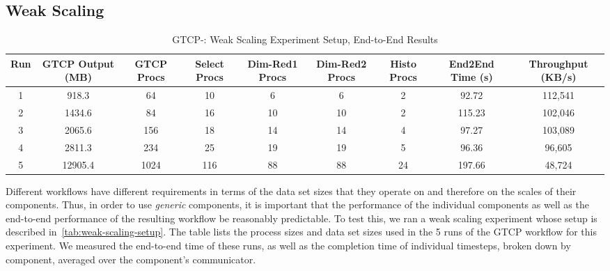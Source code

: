 \subsection{Weak Scaling}
\begin{table}[tbp]
  \centering
  \caption{GTCP-\sys: Weak Scaling Experiment Setup, End-to-End Results}
  \label{tab:weak-scaling-setup}
  \vspace{-0.07in}
  \begin{tabular}{|c|c|c|c|c|c|c|c|c|}
    \hline
    Run & GTCP Output (MB) & GTCP Procs & Select Procs & Dim-Red1 Procs & Dim-Red2 Procs & Histo Procs & End2End Time (s) & Throughput (KB/s)\\
    \hline
    1 & 918.3 & 64 & 10 & 6 & 6 & 2 & 92.72 & 112,541\\
    \hline
    2 & 1434.6 & 84 & 16 & 10 & 10 & 2 & 115.23 & 102,046\\
    \hline
    3 & 2065.6 & 156 & 18 & 14 & 14 & 4 & 97.27 & 103,089\\
    \hline
    4 & 2811.3 & 234 & 25 & 19 & 19 & 5 & 96.36 & 96,605\\
    \hline
    5 & 12905.4 & 1024 & 116 & 88 & 88 & 24 & 197.66 & 48,724\\
    \hline
  \end{tabular}
  \vspace{-0.15in}
\end{table}
Different workflows have different requirements in terms
of the data set sizes that they operate on and therefore
on the scales of their components.
Thus, in order to use \textit{generic} components, it is important
that the performance of the individual components
as well as the end-to-end performance of the resulting
workflow be reasonably predictable.
To test this, we ran a weak scaling experiment
whose setup is described in~\autoref{tab:weak-scaling-setup}.
The table lists the process sizes and data set sizes used in the 5
runs of the GTCP workflow for this experiment.
We measured the end-to-end time of these runs,
as well as the completion time of individual
timesteps, broken down by component, averaged
over the component's communicator.

